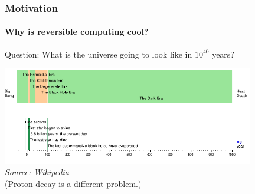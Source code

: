 \documentclass{beamer}
\newcommand{\bcite}[1]{\makebox[\textwidth][r]{\scriptsize [\cite{#1}]}}
\begin{document}










\addtocounter{page}{1}
\begin{frame}
\addtocounter{page}{-1}
\frametitle{Motivation}
\framesubtitle{\hspace{5mm}Why is reversible computing cool?} 

\begin{block}{Question:}
What is the universe going to look like in $10^{40}$ years?
\end{block}


\pause
\begin{center}
\vspace{-0.5cm}
\includegraphics[width=11cm]{universe_timeline.png}%
\\
\textit{\footnotesize{Source: Wikipedia}}
\\
\footnotesize{(Proton decay is a different problem.)}
\end{center}

\end{frame}
\end{document}
